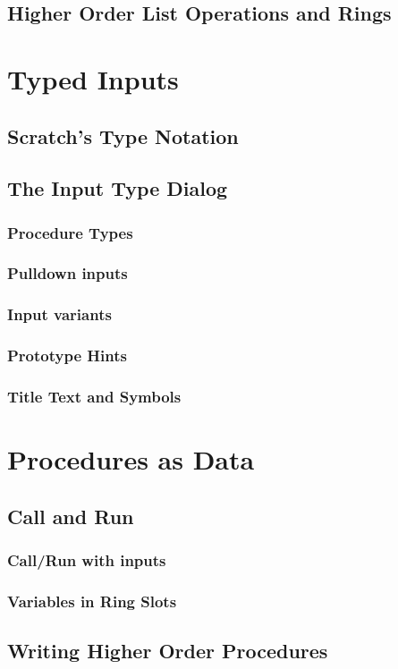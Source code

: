 \documentclass{report}
\begin{document}
\section{Higher Order List Operations and Rings}
\chapter{Typed Inputs}
\section{Scratch's Type Notation}
\section{The \Snap{} Input Type Dialog}
\subsection{Procedure Types}
\subsection{Pulldown inputs}
\subsection{Input variants}
\subsection{Prototype Hints}
\subsection{Title Text and Symbols}
\chapter{Procedures as Data}
\section{Call and Run}
\subsection{Call/Run with inputs}
\subsection{Variables in Ring Slots}
\section{Writing Higher Order Procedures}
\end{document}
